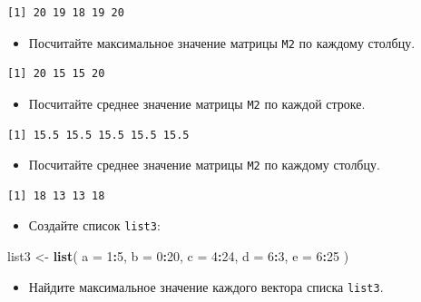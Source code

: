 \documentclass[
]{book}
\newenvironment{Shaded}{\begin{snugshade}}{\end{snugshade}}
\newcommand{\DataTypeTok}[1]{\textcolor[rgb]{0.13,0.29,0.53}{#1}}
\newcommand{\DecValTok}[1]{\textcolor[rgb]{0.00,0.00,0.81}{#1}}
\newcommand{\KeywordTok}[1]{\textcolor[rgb]{0.13,0.29,0.53}{\textbf{#1}}}
\newcommand{\NormalTok}[1]{#1}
\newcommand{\OperatorTok}[1]{\textcolor[rgb]{0.81,0.36,0.00}{\textbf{#1}}}
\newcommand{\StringTok}[1]{\textcolor[rgb]{0.31,0.60,0.02}{#1}}
\providecommand{\tightlist}{%
  \setlength{\itemsep}{0pt}\setlength{\parskip}{0pt}}
\begin{document}
\begin{verbatim}
[1] 20 19 18 19 20
\end{verbatim}

\begin{itemize}
\tightlist
\item
  Посчитайте максимальное значение матрицы \texttt{M2} по каждому столбцу.
\end{itemize}

\begin{verbatim}
[1] 20 15 15 20
\end{verbatim}

\begin{itemize}
\tightlist
\item
  Посчитайте среднее значение матрицы \texttt{M2} по каждой строке.
\end{itemize}

\begin{verbatim}
[1] 15.5 15.5 15.5 15.5 15.5
\end{verbatim}

\begin{itemize}
\tightlist
\item
  Посчитайте среднее значение матрицы \texttt{M2} по каждому столбцу.
\end{itemize}

\begin{verbatim}
[1] 18 13 13 18
\end{verbatim}

\begin{itemize}
\tightlist
\item
  Создайте список \texttt{list3}:
\end{itemize}

\begin{Shaded}
\begin{Highlighting}[]
\NormalTok{list3 <-}\StringTok{ }\KeywordTok{list}\NormalTok{(}
  \DataTypeTok{a =} \DecValTok{1}\OperatorTok{:}\DecValTok{5}\NormalTok{,}
  \DataTypeTok{b =} \DecValTok{0}\OperatorTok{:}\DecValTok{20}\NormalTok{,}
  \DataTypeTok{c =} \DecValTok{4}\OperatorTok{:}\DecValTok{24}\NormalTok{,}
  \DataTypeTok{d =} \DecValTok{6}\OperatorTok{:}\DecValTok{3}\NormalTok{,}
  \DataTypeTok{e =} \DecValTok{6}\OperatorTok{:}\DecValTok{25}
\NormalTok{  )}
\end{Highlighting}
\end{Shaded}

\begin{itemize}
\tightlist
\item
  Найдите максимальное значение каждого вектора списка \texttt{list3}.
\end{itemize}
\end{document}
